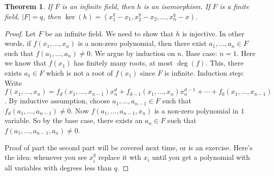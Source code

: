 \documentclass{article}
\theoremstyle{plain}
\newtheorem{theorem}{Theorem}
\theoremstyle{remark}
\begin{document}
\begin{theorem}
	If $F$ is an infinite field, then $h$ is an isomorphism.
	If $F$ is a finite field, $|F| = q$,
	then $\ker(h) = (x_1^q-x_1, x_2^q-x_2,\dots,x_n^q-x)$.
\end{theorem}
\begin{proof}
	Let $F$ be an infinite field.
	We need to show that $h$ is injective.
	In other words, if $f(x_1,\dots,x_n)$ is a non-zero polynomial,
	then there exist $a_1,\dots,a_n \in F$ such that $f(a_1,\dots,a_n) \neq 0$.
	We argue by induction on $n$.
	Base case: $n = 1$. Here we know that $f(x_1)$ has finitely many roots,
	at most $\deg(f)$.
	This, there exists $a_1 \in F$ which is not a root of $f(x_1)$ since $F$ is infinite.
	Induction step: Write $f(x_1,\dots,x_n) = f_d(x_1,\dots,x_{n-1})x^d_n
	+ f_{d-1}(x_1,\dots,x_n)x_n^{d-1} + \cdots + f_0(x_1,\dots,x_{n-1})$.
	By inductive assumption, choose $a_1,\dots,a_{n-1} \in F$ such that
	$f_d(a_1,\dots,a_{n-1}) \neq 0$.
	Now $f(a_1,\dots,a_{n-1},x_n)$ is a non-zero polynomial in $1$ variable.
	So by the base case, there exists an $a_n \in F$ such that
	$f(a_1,\dots,a_{n-1},a_n) \neq 0$.

	Proof of part the second part will be covered next time, or is an exercise.
	Here's the idea: whenever you see $x_i^q$ replace it wth $x_i$
	until you get a polynomial with all variables with degrees less than $q$.
\end{proof}
\end{document}
